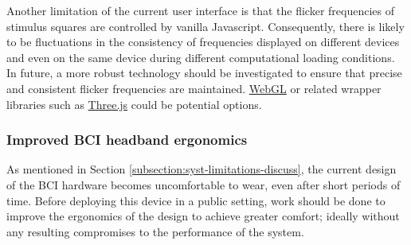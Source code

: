 Another limitation of the current user interface is that the flicker frequencies of stimulus squares are controlled by vanilla Javascript. Consequently, there is likely to be fluctuations in the consistency of frequencies displayed on different devices and even on the same device during different computational loading conditions. In future, a more robust technology should be investigated to ensure that precise and consistent flicker frequencies are maintained. \href{https://www.khronos.org/webgl/}{WebGL} or related wrapper libraries such as \href{https://threejs.org/}{Three.js} could be potential options.

\subsubsection{Improved BCI headband ergonomics}
As mentioned in Section \ref{subsection:syst-limitations-discuss}, the current design of the BCI hardware becomes uncomfortable to wear, even after short periods of time. Before deploying this device in a public setting, work should be done to improve the ergonomics of the design to achieve greater comfort; ideally without any resulting compromises to the performance of the system.